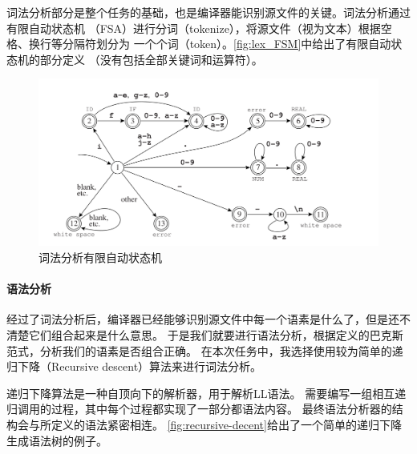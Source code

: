 词法分析部分是整个任务的基础，也是编译器能识别源文件的关键。词法分析通过有限自动状态机
（FSA）进行分词（tokenize），将源文件（视为文本）根据空格、换行等分隔符划分为
一个个词（token）。\autoref{fig:lex_FSM}中给出了有限自动状态机的部分定义
（没有包括全部关键词和运算符）。

\begin{figure}[hbt]
	\centering
	\includegraphics[scale=.25]{FSM1.png}
	\caption{词法分析有限自动状态机}\label{fig:lex_FSM}
\end{figure}

\paragraph{语法分析}

经过了词法分析后，编译器已经能够识别源文件中每一个语素是什么了，但是还不清楚它们组合起来是什么意思。
于是我们就要进行语法分析，根据定义的巴克斯范式，分析我们的语素是否组合正确。
在本次任务中，我选择使用较为简单的递归下降（Recursive descent）算法来进行词法分析。
\cite{53e9b0b2b7602d9703b20db9,Recursive-programming,appel2004modern,muchnick1997advanced,aho1986compilers}

递归下降算法是一种自顶向下的解析器，用于解析LL语法\cite{aho1986compilers}。
需要编写一组相互递归调用的过程，其中每个过程都实现了一部分都语法内容。
最终语法分析器的结构会与所定义的语法紧密相连。
\autoref{fig:recursive-decent}给出了一个简单的递归下降生成语法树的例子。

